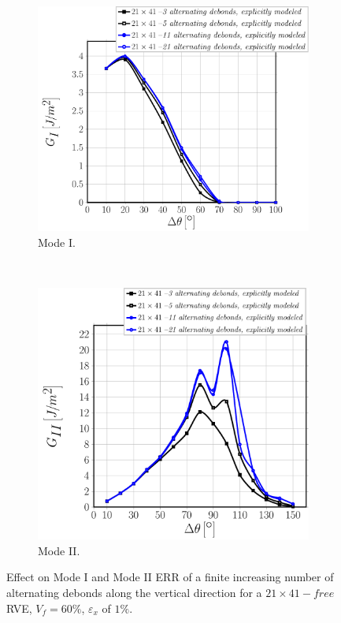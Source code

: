 \documentclass[smallextended]{svjour3}       %
\begin{document}
\begin{figure}[!h]
\centering
    \begin{subfigure}[b]{0.475\textwidth}
        \includegraphics[width=\textwidth]{asymm-explicitmodel-increasing-vf60-GI.pdf}
        \caption{Mode I.}\label{subfig:finitedebsalternatingGI}
    \end{subfigure} ~
    \begin{subfigure}[b]{0.475\textwidth}
        \includegraphics[width=\textwidth]{asymm-explicitmodel-increasing-vf60-GII.pdf}
        \caption{Mode II.}\label{subfig:finitedebsalternatingGII}
    \end{subfigure}

\caption{Effect on Mode I and Mode II ERR of a finite increasing number of alternating debonds along the vertical direction for a $21\times41-free$ RVE, $V_{f}=60\%$, $\varepsilon_{x}$ of $1\%$.}\label{fig:finitedebsalternating}
\end{figure}
\end{document}
